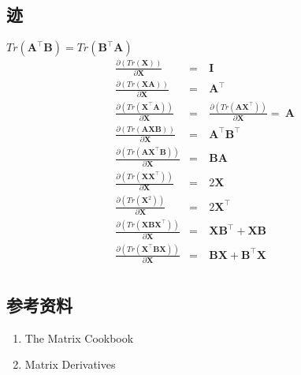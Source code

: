 \documentclass[letterpaper,10pt,english]{sphinxmanual}
\begin{document}
\subsection{迹}
\label{\detokenize{machineLearning/04_derivative:id4}}
\(Tr(\mathbf{A}^{\top}\mathbf{B}) = Tr(\mathbf{B}^{\top}\mathbf{A})\)
\begin{equation*}
\begin{split}\frac{\partial{(Tr(\mathbf{X}))}}{\partial{\mathbf{X}}} & = & \ \mathbf{I} \\
\frac{\partial{(Tr(\mathbf{X} \mathbf{A}))}}{\partial{\mathbf{X}}} & = & \ \mathbf{A}^{\top} \\
\frac{\partial{(Tr(\mathbf{X}^{\top} \mathbf{A}))}}{\partial{\mathbf{X}}} & = & \ \frac{\partial{(Tr(\mathbf{A} \mathbf{X}^{\top}))}}{\partial{\mathbf{X}}} = \  \mathbf{A} \\
\frac{\partial{(Tr(\mathbf{A} \mathbf{X} \mathbf{B}))}}{\partial{\mathbf{X}}} & = & \ \mathbf{A}^{\top}\mathbf{B}^{\top} \\
\frac{\partial{(Tr(\mathbf{A} \mathbf{X}^{\top} \mathbf{B}))}}{\partial{\mathbf{X}}} & = & \ \mathbf{B}\mathbf{A} \\
\frac{\partial{(Tr(\mathbf{X} \mathbf{X}^{\top}))}}{\partial{\mathbf{X}}} & = & \ 2 \mathbf{X} \\
\frac{\partial{(Tr(\mathbf{X}^{2}))}}{\partial{\mathbf{X}}} & = & \ 2 \mathbf{X}^{\top} \\
\frac{\partial{(Tr(\mathbf{X} \mathbf{B} \mathbf{X}^{\top}))}}{\partial{\mathbf{X}}} & = & \ \mathbf{X}\mathbf{B}^{\top} + \mathbf{X}\mathbf{B} \\
\frac{\partial{(Tr(\mathbf{X}^{\top} \mathbf{B} \mathbf{X}))}}{\partial{\mathbf{X}}} & = & \ \mathbf{B}\mathbf{X} + \mathbf{B}^{\top}\mathbf{X} \\\end{split}
\end{equation*}

\subsection{参考资料}
\label{\detokenize{machineLearning/04_derivative:id5}}\begin{enumerate}
\item {} 
The Matrix Cookbook

\end{enumerate}
\begin{quote}

\end{quote}
\begin{enumerate}
\setcounter{enumi}{1}
\item {} 
Matrix Derivatives

\end{enumerate}
\begin{quote}

\end{quote}
\end{document}
